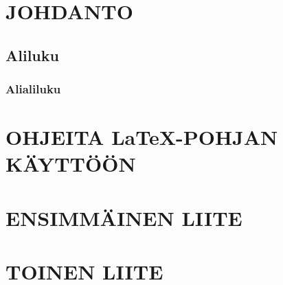 \documentclass[a4paper, 11pt, oneside, finnish, includehead]{article}%
\begin{document}
\section{JOHDANTO}

\subsection{Aliluku}
\subsubsection{Alialiluku}

\section{OHJEITA LaTeX-POHJAN KÄYTTÖÖN}

\pagebreak
\appendix

\section{ENSIMMÄINEN LIITE}

\section{TOINEN LIITE}
\end{document}
